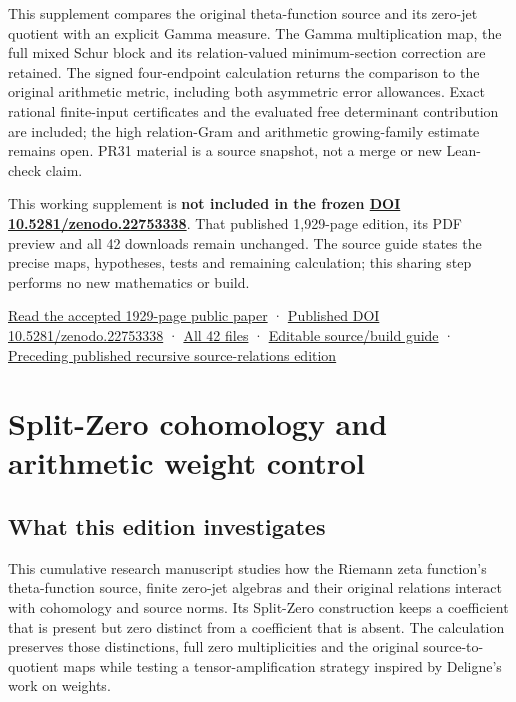 \documentclass[
]{article}
\begin{document}
This supplement compares the original theta-function source and its
zero-jet quotient with an explicit Gamma measure. The Gamma
multiplication map, the full mixed Schur block and its relation-valued
minimum-section correction are retained. The signed four-endpoint
calculation returns the comparison to the original arithmetic metric,
including both asymmetric error allowances. Exact rational finite-input
certificates and the evaluated free determinant contribution are
included; the high relation-Gram and arithmetic growing-family estimate
remains open. PR31 material is a source snapshot, not a merge or new
Lean-check claim.

This working supplement is \textbf{not included in the frozen
\href{https://doi.org/10.5281/zenodo.22753338}{DOI
10.5281/zenodo.22753338}}. That published 1,929-page edition, its PDF
preview and all 42 downloads remain unchanged. The source guide states
the precise maps, hypotheses, tests and remaining calculation; this
sharing step performs no new mathematics or build.

\href{https://zenodo.org/api/records/22753338/files/41-splitzero-cumulative-graph-public-reader.pdf/content}{Read
the accepted 1929-page public paper} ·
\href{https://doi.org/10.5281/zenodo.22753338}{Published DOI
10.5281/zenodo.22753338} ·
\href{calculation_edition_20260914_cumulative_graph/README.md}{All 42
files} ·
\href{workbenches/splitzero-tandem/continuations/20260914-cumulative-graph/README.md}{Editable
source/build guide} ·
\href{https://doi.org/10.5281/zenodo.22739630}{Preceding published
recursive source-relations edition}

\section{Split-Zero cohomology and arithmetic weight
control}\label{split-zero-cohomology-and-arithmetic-weight-control}

\subsection{What this edition
investigates}\label{what-this-edition-investigates}

This cumulative research manuscript studies how the Riemann zeta
function's theta-function source, finite zero-jet algebras and their
original relations interact with cohomology and source norms. Its
Split-Zero construction keeps a coefficient that is present but zero
distinct from a coefficient that is absent. The calculation preserves
those distinctions, full zero multiplicities and the original
source-to-quotient maps while testing a tensor-amplification strategy
inspired by Deligne's work on weights.
\end{document}
